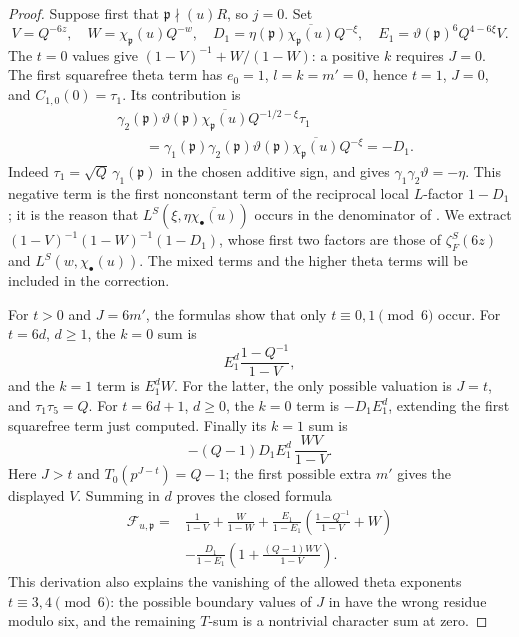 \begin{proof}
Suppose first that \(\mathfrak p\nmid(u)R\), so \(j=0\).  Set
\[
 V=Q^{-6z},\quad
 W=\chi_{\mathfrak p}(u)Q^{-w},\quad
 D_1=\eta(\mathfrak p)\overline{\chi_{\mathfrak p}(u)}Q^{-\xi},
 \quad
 E_1=\vartheta(\mathfrak p)^6Q^{4-6\xi}V.
\]
The \(t=0\) values give
\((1-V)^{-1}+W/(1-W)\): a positive \(k\) requires \(J=0\).
The first squarefree theta term has
\(e_0=1\), \(l=k=m'=0\), hence \(t=1\), \(J=0\), and
\(C_{1,0}(0)=\tau_1\).  Its contribution is
\[
 \begin{split}
 &\gamma_2(\mathfrak p)\vartheta(\mathfrak p)
  \overline{\chi_{\mathfrak p}(u)}Q^{-1/2-\xi}\tau_1\\
 &\qquad=\gamma_1(\mathfrak p)\gamma_2(\mathfrak p)
   \vartheta(\mathfrak p)\overline{\chi_{\mathfrak p}(u)}Q^{-\xi}
   =-D_1.
 \end{split}
\]
Indeed \(\tau_1=\sqrt Q\,\gamma_1(\mathfrak p)\) in the chosen additive
sign, and  gives
\(\gamma_1\gamma_2\vartheta=-\eta\).  This negative term is the first
nonconstant term of the reciprocal local \(L\)-factor \(1-D_1\); it is
the reason that \(L^S(\xi,\eta\overline{\chi_\bullet(u)})\) occurs in the
denominator of .  We extract
\((1-V)^{-1}(1-W)^{-1}(1-D_1)\), whose first two factors are those of
\(\zeta_F^S(6z)\) and \(L^S(w,\chi_\bullet(u))\).  The mixed terms and
the higher theta terms will be included in the correction.

For \(t>0\) and \(J=6m'\), the formulas show that only
\(t\equiv0,1\pmod6\) occur.  For \(t=6d\), \(d\ge1\), the \(k=0\) sum is
\[
 E_1^d\frac{1-Q^{-1}}{1-V},
\]
and the \(k=1\) term is \(E_1^dW\).  For the latter, the only possible
valuation is \(J=t\), and \(\tau_1\tau_5=Q\).  For \(t=6d+1\), \(d\ge0\),
the \(k=0\) term is \(-D_1E_1^d\), extending the first squarefree term
just computed.  Finally its \(k=1\) sum is
\[
 -(Q-1)D_1E_1^d\,\frac{WV}{1-V}.
\]
Here \(J>t\) and \(T_0(p^{J-t})=Q-1\); the first possible extra
\(m'\) gives the displayed \(V\).  Summing in \(d\) proves the closed
formula
\begin{equation}
 \begin{split}
 \mathcal F_{u,\mathfrak p}
  ={}&\frac1{1-V}+\frac W{1-W}
   +\frac{E_1}{1-E_1}
           \left(\frac{1-Q^{-1}}{1-V}+W\right)\\
   &-\frac{D_1}{1-E_1}
           \left(1+\frac{(Q-1)WV}{1-V}\right).
 \end{split}
\label{eq:Euler-good-exact}
\end{equation}
This derivation also explains the vanishing of the allowed theta exponents
\(t\equiv3,4\pmod6\): the possible boundary values of \(J\) in
 have the wrong residue modulo six, and the
remaining \(T\)-sum is a nontrivial character sum at zero.


\end{proof}
